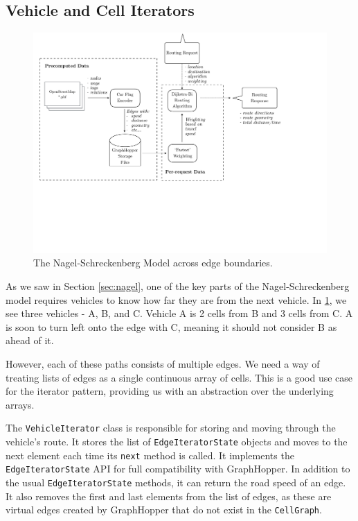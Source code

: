 \documentclass[ %
                    author={Alexander Hill},
                supervisor={Dr. Benjamin Sach},
                    degree={MEng},
                     title={MARMOSET},
                  subtitle={Multi-Agent Route Management using Online Simulation for Efficient Transportation},
                      type={research},
                      year={2016} ]{dissertation}
\begin{document}
\subsection{Vehicle and Cell Iterators}

\begin{figure}[h]
    \centering
    \includegraphics[scale=0.5,page=5,clip,trim=0 15cm 15cm 0]{architecture}
    \caption{The Nagel-Schreckenberg Model across edge boundaries.}\label{fig:nagel-multi}
\end{figure}

As we saw in Section \ref{sec:nagel}, one of the key parts of the
Nagel-Schreckenberg model requires vehicles to know how far they are from the
next vehicle. In \ref{fig:nagel-multi}, we see three vehicles - A, B, and C.
Vehicle A is 2 cells from B and 3 cells from C. A is soon to turn left onto the
edge with C, meaning it should not consider B as ahead of it.

However, each of these paths consists of multiple edges. We need a way of
treating lists of edges as a single continuous array of cells. This is a good
use case for the iterator pattern, providing us with an abstraction over the
underlying arrays.

The \texttt{VehicleIterator} class is responsible for storing and moving through
the vehicle's route. It stores the list of \texttt{EdgeIteratorState} objects and moves
to the next element each time its \texttt{next} method is called. It implements
the \texttt{EdgeIteratorState} API for full compatibility with GraphHopper. In
addition to the usual \texttt{EdgeIteratorState} methods, it can return the road
speed of an edge. It also removes the first and last elements from the list of
edges, as these are virtual edges created by GraphHopper that do not exist in
the \texttt{CellGraph}.
\end{document}
